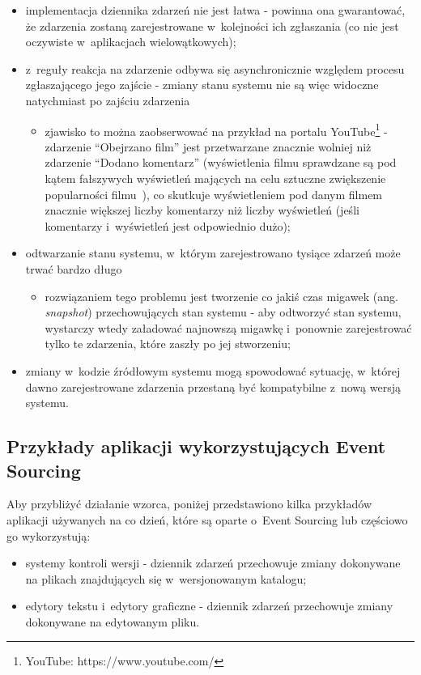 \begin{itemize}
 \item implementacja dziennika zdarzeń nie jest łatwa - powinna ona gwarantować, że zdarzenia zostaną zarejestrowane w~kolejności ich zgłaszania (co nie jest oczywiste w~aplikacjach wielowątkowych);
 \item z~reguły reakcja na zdarzenie odbywa się asynchronicznie względem procesu zgłaszającego jego zajście - zmiany stanu systemu nie są więc widoczne natychmiast po zajściu zdarzenia
  \begin{itemize}
   \item zjawisko to można zaobserwować na przykład na portalu YouTube\footnote{YouTube: https://www.youtube.com/} - zdarzenie ``Obejrzano film'' jest przetwarzane znacznie wolniej niż zdarzenie ``Dodano komentarz'' (wyświetlenia filmu sprawdzane są pod kątem fałszywych wyświetleń mających na celu sztuczne zwiększenie popularności filmu~\cite{youtube:301}), co skutkuje wyświetleniem pod danym filmem znacznie większej liczby komentarzy niż liczby wyświetleń (jeśli komentarzy i~wyświetleń jest odpowiednio dużo);
  \end{itemize}
 \item odtwarzanie stanu systemu, w~którym zarejestrowano tysiące zdarzeń może trwać bardzo długo
  \begin{itemize}
   \item rozwiązaniem tego problemu jest tworzenie co jakiś czas migawek (ang. \emph{snapshot}) przechowujących stan systemu - aby odtworzyć stan systemu, wystarczy wtedy załadować najnowszą migawkę i~ponownie zarejestrować tylko te zdarzenia, które zaszły po jej stworzeniu;
  \end{itemize}
 \item zmiany w~kodzie źródłowym systemu mogą spowodować sytuację, w~której dawno zarejestrowane zdarzenia przestaną być kompatybilne z~nową wersją systemu.
\end{itemize}


\subsection{Przykłady aplikacji wykorzystujących Event Sourcing}

Aby przybliżyć działanie wzorca, poniżej przedstawiono kilka przykładów aplikacji używanych na co dzień, które są oparte o~Event Sourcing lub częściowo go wykorzystują:

\begin{itemize}
 \item systemy kontroli wersji - dziennik zdarzeń przechowuje zmiany dokonywane na plikach znajdujących się w~wersjonowanym katalogu;
 \item edytory tekstu i~edytory graficzne - dziennik zdarzeń przechowuje zmiany dokonywane na edytowanym pliku.
\end{itemize}

